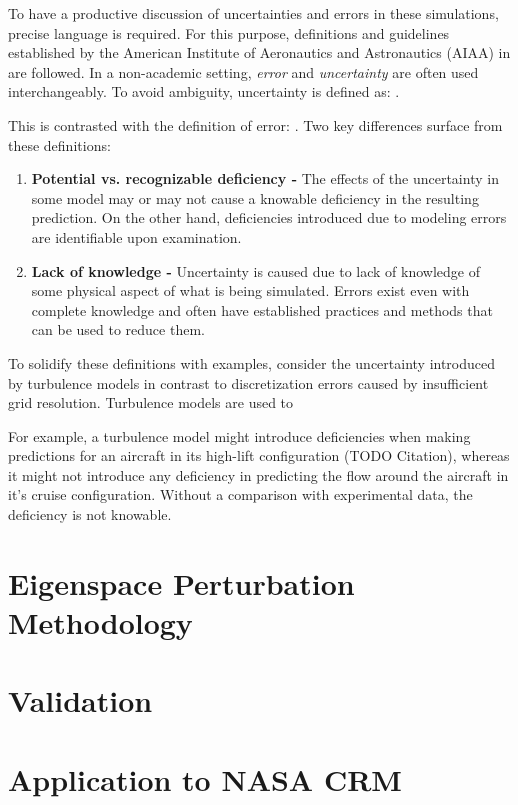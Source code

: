 To have a productive discussion of uncertainties and errors in these simulations, precise language is required. For this purpose, definitions and guidelines established by the American Institute of Aeronautics and Astronautics (AIAA) in \cite{computational_fluid_dynamics_committee_guide_1998} are followed. In a non-academic setting, \textit{error} and \textit{uncertainty} are often used interchangeably. To avoid ambiguity, uncertainty is defined as: 
 \cite{computational_fluid_dynamics_committee_guide_1998}. 

This is contrasted with the definition of error: 
 \cite{computational_fluid_dynamics_committee_guide_1998}. Two key differences surface from these definitions: 

\begin{enumerate}
    \item \textbf{Potential vs. recognizable deficiency -} The effects of the uncertainty in some model may or may not cause a knowable deficiency in the resulting prediction. On the other hand, deficiencies introduced due to modeling errors are identifiable upon examination. 
    
    \item \textbf{Lack of knowledge -} Uncertainty is caused due to lack of knowledge of some physical aspect of what is being simulated. Errors exist even with complete knowledge and often have established practices and methods that can be used to reduce them.  
\end{enumerate}

To solidify these definitions with examples, consider the uncertainty introduced by turbulence models in contrast to discretization errors caused by insufficient grid resolution. Turbulence models are used to 

For example, a turbulence model might introduce deficiencies when making predictions for an aircraft in its high-lift configuration (TODO Citation), whereas it might not introduce any deficiency in predicting the flow around the aircraft in it's cruise configuration. Without a comparison with experimental data, the deficiency is not knowable.

\section{Eigenspace Perturbation Methodology}

\section{Validation}

\section{Application to NASA CRM}
